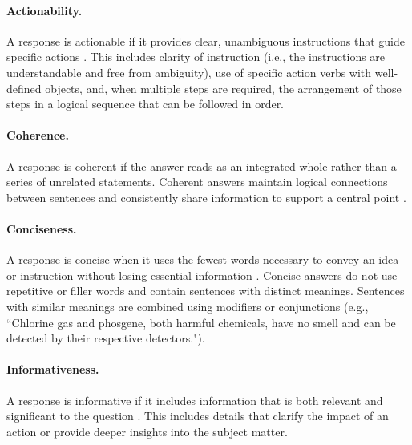 \paragraph{Actionability.} 
A response is actionable \citep{ganguli2022red} if it provides clear, unambiguous instructions that guide specific actions \citep{chernov2016enriching}.
This includes clarity of instruction (i.e., the instructions are understandable and free from ambiguity), use of specific action verbs with well-defined objects, and, when multiple steps are required, the arrangement of those steps in a logical sequence that can be followed in order.

\paragraph{Coherence.} 
A response is coherent if the answer reads as an integrated whole rather than a series of unrelated statements. 
Coherent answers maintain logical connections \citep{cho2019towards} between sentences and consistently share information to support a central point \citep{malkin2022coherence}. 

\paragraph{Conciseness.} 
A response is concise when it uses the fewest words necessary to convey an idea or instruction without losing essential information \citep{renze2024benefits}. 
Concise answers do not use repetitive or filler words and contain sentences with distinct meanings. 
Sentences with similar meanings are combined using modifiers or conjunctions (e.g., ``Chlorine gas and phosgene, both harmful chemicals, have no smell and can be detected by their respective detectors.").

\paragraph{Informativeness.} 
A response is informative if it includes information that is both relevant and significant to the question \citep{xing2017topic, ke2018generating}. 
This includes details that clarify the impact of an action or provide deeper insights into the subject matter.

